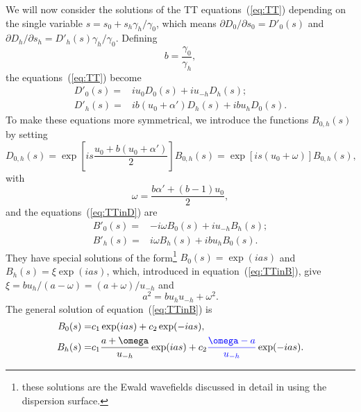 \documentclass[preprint]{iucr}              %
\newcommand{\inblue}[1]{{\color{blue}#1}}
\begin{document}
We will now consider the solutions of the TT equations~(\ref{eq:TT}) depending on the single variable $s=s_0+s_h \gamma_h/\gamma_0$, which means 
$\partial D_{0} / \partial  s_{0}=D'_{0}(s)$ and $\partial D_{h} / \partial s_{h}=D'_{h}(s)\gamma_h/\gamma_0$.
Defining 
\begin{equation}\label{eq:b}
b = \frac{\gamma_0}{\gamma_h},    
\end{equation}
the equations~(\ref{eq:TT}) become
\begin{subequations}
\label{eq:TTinD}
\begin{align}
D'_0(s) =& i u_0 D_0(s) + i u_{-h} D_h(s); \\
D'_h(s) =& i b (u_0 + \alpha') D_h(s) + i b u_{h} D_0(s).
\end{align}
\end{subequations}
\inblue{To make these equations more symmetrical, we} introduce the functions $B_{0,h}(s)$ by setting
\begin{equation}
\label{eq:Bdefinition}
D_{0,h}(s) = 
\exp \left[ i s \frac{u_0 + b (u_0+\alpha')}{2} \right] B_{0,h}(s) = 
\exp[i s (u_0+\omega)] B_{0,h}(s),  
\end{equation}
with
\begin{equation}\label{eq:omega}
    \omega=\frac{ b \alpha' + (b-1) u_0}{2},
\end{equation}
\inblue{and the
equations~(\ref{eq:TTinD}) are} 
\begin{subequations}
\label{eq:TTinB}
\begin{align}
B'_0(s) =& -i \omega B_0(s) + i u_{-h} B_h(s); \\
B'_h(s) =& i \omega B_h(s) + i b u_{h} B_0(s).
\end{align}
\end{subequations}
They have special solutions of the form\footnote{these solutions are the Ewald wavefields discussed in detail in \cite{authierbook} using the dispersion surface.} $B_0(s)=\exp(i a s)$ and $B_h(s)=\xi \exp(i a s)$, which, introduced in equation~(\ref{eq:TTinB}), give $\xi=bu_h/(a-\omega)=(a+\omega)/u_{-h}$ and 
\begin{equation}\label{eq:a}
    a^2=b u_h u_{-h}+\omega^2.
\end{equation}
The general solution of equation~(\ref{eq:TTinB}) is
\begin{subequations}
\label{eq:BSolutions}
\begin{align}
B_0(s) = &c_1 \exp(i a s) + c_2 \exp(-i a s), \\
B_h(s) = &c_1 \frac{a+\omega}{u_{-h}} \exp(i a s) + c_2 
\inblue{\frac{\omega-a}{u_{-h}}} \exp(-i a s).
\end{align}
\end{subequations}
\end{document}
